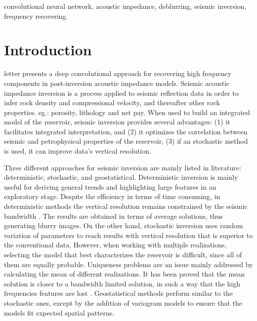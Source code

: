 \documentclass[journal]{IEEEtran}
\begin{document}
\begin{IEEEkeywords}
convolutional neural network, acoustic impedance, deblurring, seismic inversion, frequency recovering.
\end{IEEEkeywords}

\IEEEpeerreviewmaketitle



\section{Introduction}

 letter presents a deep convolutional
approach for recovering high frequency components in
post-inversion acoustic impedance models.
Seismic acoustic impedance inversion is a process applied to 
seismic reflection data in order to infer rock density and 
compressional velocity, and thereafter other rock properties.
eg.: porosity, lithology and net pay. When used to build an
integrated model of the reservoir, seismic inversion provides
several advantages: (1) it facilitates integrated interpretation, 
and (2) it optimizes the correlation between seismic and petrophysical
properties of the reservoir, (3) if an stochastic method is used,
it can improve data's vertical resolution.

Three different approaches for seismic inversion are mainly listed in 
literature: deterministic, stochastic, and 
geostatistical. Deterministic inversion is mainly useful for deriving general
trends and highlighting large features in an exploratory stage.
Despite the efficiency in terms of time consuming,
in deterministic methods the vertical resolution remains
constrained by the seismic bandwidth \cite{Sancevero2005}.
The results are obtained in terms of average solutions, thus generating
blurry images. On the other hand, stochastic inversion uses random variation
of parameters to reach results with vertical resolution that is
superior to the conventional data. However, when working with multiple
realizations, selecting the model that best characterizes the
reservoir is difficult, since all of them are equally probable.
Uniqueness problems are an issue mainly addressed by calculating
the mean of different realizations. It has been proved
that the mean solution is closer to a bandwidth limited solution,
in such a way that the high frequencies features are lost
\cite{Cook2010}. Geostatistical methods perform similar
to the stochastic ones, except by the addition of variogram models
to ensure that the models fit expected spatial patterns.
\end{document}
